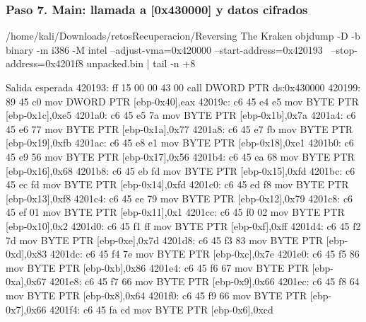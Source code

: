 \documentclass[11pt,a4paper]{article}
\begin{document}
\subsubsection*{Paso 7. Main: llamada a [0x430000] y datos cifrados}
\begin{comando}{/home/kali/Downloads/retosRecuperacion/Reversing The Kraken}
objdump -D -b binary -m i386 -M intel --adjust-vma=0x420000 --start-address=0x420193 \
  --stop-address=0x4201f8 unpacked.bin | tail -n +8
\end{comando}
\begin{salidan}{Salida esperada}
  420193:       ff 15 00 00 43 00       call   DWORD PTR ds:0x430000
  420199:       89 45 c0                mov    DWORD PTR [ebp-0x40],eax
  42019c:       c6 45 e4 e5             mov    BYTE PTR [ebp-0x1c],0xe5
  4201a0:       c6 45 e5 7a             mov    BYTE PTR [ebp-0x1b],0x7a
  4201a4:       c6 45 e6 77             mov    BYTE PTR [ebp-0x1a],0x77
  4201a8:       c6 45 e7 fb             mov    BYTE PTR [ebp-0x19],0xfb
  4201ac:       c6 45 e8 e1             mov    BYTE PTR [ebp-0x18],0xe1
  4201b0:       c6 45 e9 56             mov    BYTE PTR [ebp-0x17],0x56
  4201b4:       c6 45 ea 68             mov    BYTE PTR [ebp-0x16],0x68
  4201b8:       c6 45 eb fd             mov    BYTE PTR [ebp-0x15],0xfd
  4201bc:       c6 45 ec fd             mov    BYTE PTR [ebp-0x14],0xfd
  4201c0:       c6 45 ed f8             mov    BYTE PTR [ebp-0x13],0xf8
  4201c4:       c6 45 ee 79             mov    BYTE PTR [ebp-0x12],0x79
  4201c8:       c6 45 ef 01             mov    BYTE PTR [ebp-0x11],0x1
  4201cc:       c6 45 f0 02             mov    BYTE PTR [ebp-0x10],0x2
  4201d0:       c6 45 f1 ff             mov    BYTE PTR [ebp-0xf],0xff
  4201d4:       c6 45 f2 7d             mov    BYTE PTR [ebp-0xe],0x7d
  4201d8:       c6 45 f3 83             mov    BYTE PTR [ebp-0xd],0x83
  4201dc:       c6 45 f4 7e             mov    BYTE PTR [ebp-0xc],0x7e
  4201e0:       c6 45 f5 86             mov    BYTE PTR [ebp-0xb],0x86
  4201e4:       c6 45 f6 67             mov    BYTE PTR [ebp-0xa],0x67
  4201e8:       c6 45 f7 66             mov    BYTE PTR [ebp-0x9],0x66
  4201ec:       c6 45 f8 64             mov    BYTE PTR [ebp-0x8],0x64
  4201f0:       c6 45 f9 66             mov    BYTE PTR [ebp-0x7],0x66
  4201f4:       c6 45 fa cd             mov    BYTE PTR [ebp-0x6],0xcd
\end{salidan}
\end{document}
